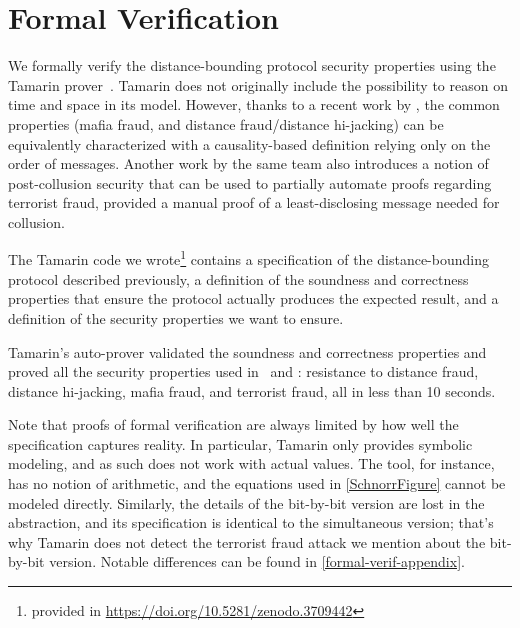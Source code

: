 \section{Formal Verification}\label{formal-verification}

We formally verify the distance-bounding protocol security properties using the Tamarin
prover~\cite{meier2013tamarin}. Tamarin does not originally include
the possibility to reason on time and space in its model.  However,
thanks to a recent work by \textcite{TamarinDB}, the common properties
(mafia fraud, and distance fraud/distance hi-jacking) can be equivalently 
characterized with a causality-based definition relying only on the order
of messages.
Another work by the same team \textcite{TamarinDBTF} also introduces a
notion of post-collusion security that can be used to partially automate
proofs regarding terrorist fraud, provided a manual proof of a least-disclosing
message needed for collusion.


The Tamarin code we wrote\footnote{provided in \url{https://doi.org/10.5281/zenodo.3709442}}%
 contains a specification of the distance-bounding protocol described previously, a definition 
 of the soundness and correctness properties that ensure the protocol actually produces the
 expected result, and a definition of the security properties we want to ensure.

Tamarin's auto-prover validated the soundness and correctness
properties and proved all the security
properties used in~\cite{TamarinDB} and \textcite{TamarinDBTF}: resistance to distance fraud, distance hi-jacking, mafia fraud, and terrorist fraud, all in less than 10 seconds.

Note that proofs of formal verification are always limited by how well the specification captures reality.
In particular, Tamarin only provides symbolic modeling, and as such does not work with actual values. The tool, for instance, has no notion of arithmetic, and the equations used in \cref{SchnorrFigure} cannot be modeled directly. Similarly, the details of the bit-by-bit version are lost in the abstraction, and its specification is identical to the simultaneous version; that's why Tamarin does not detect the terrorist fraud attack we mention about the bit-by-bit version.
Notable differences can be found in \cref{formal-verif-appendix}.
